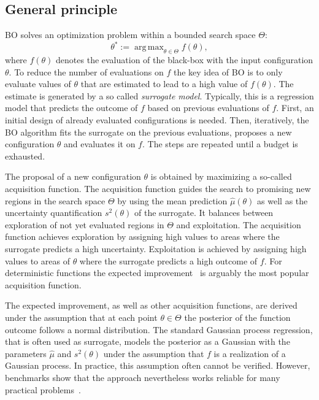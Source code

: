 \documentclass[bimj,fleqn]{w-art}
\theoremstyle{plain}
\theoremstyle{definition}
\begin{document}
\subsection{General principle}
BO solves an optimization problem within a bounded search space $\Theta$:
\[
\theta^\ast := \operatorname{arg\,max}_{\theta \in \Theta} f(\theta),
\]
where $f(\theta)$ denotes the evaluation of the black-box with the input configuration $\theta$.
To reduce the number of evaluations on $f$ the key idea of BO is to only evaluate values of $\theta$ that are estimated to lead to a high value of $f(\theta)$.
The estimate is generated by a so called \emph{surrogate model}.
Typically, this is a regression model that predicts the outcome of $f$ based on previous evaluations of $f$.
First, an initial design of already evaluated configurations is needed.
Then, iteratively, the BO algorithm fits the surrogate on the previous evaluations, proposes a new configuration $\theta$ and evaluates it on $f$.
The steps are repeated until a budget is exhausted.

The proposal of a new configuration $\theta$ is obtained by maximizing a so-called acquisition function.
The acquisition function guides the search to promising new regions in the search space $\Theta$ by using the mean prediction $\hat{\mu}(\theta)$ as well as the uncertainty quantification $s^2(\theta)$ of the surrogate.
It balances between exploration of not yet evaluated regions in $\Theta$ and exploitation.
The acquisition function achieves exploration by assigning high values to areas where the surrogate predicts a high uncertainty.
Exploitation is achieved by assigning high values to areas of $\theta$ where the surrogate predicts a high outcome of $f$.
For deterministic functions the expected improvement~\citep{jones_efficient_1998} is arguably the most popular acquisition function.

The expected improvement, as well as other acquisition functions, are derived under the assumption that at each point $\theta \in \Theta$ the posterior of the function outcome follows a normal distribution.
The standard Gaussian process regression, that is often used as surrogate, models the posterior as a Gaussian with the parameters $\hat{\mu}$ and $s^2(\theta)$ under the assumption that $f$ is a realization of a Gaussian process.
In practice, this assumption often cannot be verified.
However, benchmarks show that the approach nevertheless works reliable for many practical problems~\citep{bischl_mlrmbo_2017,snoek_practical_2012}.
\end{document}
